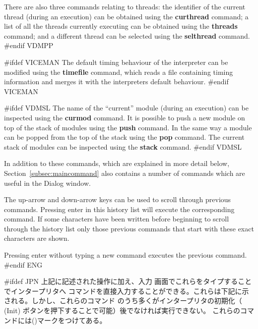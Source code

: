 \documentclass[\pformat,12pt]{article}
\newcommand{\guicmd}[1]{{\sf #1}}
\newcommand{\guicmd}[1]{{\gt #1}}
\begin{document}
There are also three commands relating to threads: the identifier of
the current thread (during an execution) can be obtained using the
\textbf{curthread} command; a list of all
the threads currently executing can be obtained using the
\textbf{threads} command; and a 
different thread can be selected using the \textbf{selthread}
command.
#endif VDMPP

#ifdef VICEMAN
The default timing behaviour of the interpreter can be modified using
the \textbf{timefile} command, which reads a file containing timing
information and merges it with the interpreters default behaviour.
#endif VICEMAN

#ifdef VDMSL
The name of the ``current'' module (during an execution) can be
inspected using the \textbf{curmod} command. It is possible to push a 
new module on top of the stack of modules using the \textbf{push}
command. In the same way a module can be popped from the top of the
stack using the \textbf{pop} command. The current stack of modules can
be inspected using the \textbf{stack} command.
#endif VDMSL

In addition to these commands, which are explained in more detail below,
Section~\ref{subsec:maincommand} also contains a number of commands
which are useful in the \guicmd{Dialog} window.

The up-arrow and down-arrow keys can be used to scroll through
previous commands. Pressing enter in this history list will execute
the corresponding command.  If some characters have been written
before beginning to scroll through the history list only those
previous commands that start with these exact characters are shown.

Pressing enter without typing a new command executes the previous
command.
#endif ENG

#ifdef JPN
上記に記述された操作に加え、\guicmd{入力} 画面でこれらをタイプすることでインタープリタへ
コマンドを直接入力することができる。これらは下記に示される。しかし、これらのコマンド
のうち多くがインタープリタの初期化（
(\guicmd{Init}) ボタンを押下することで可能）後でなければ実行できない。
これらのコマンドには({\tt *})マークをつけてある。
\end{document}
